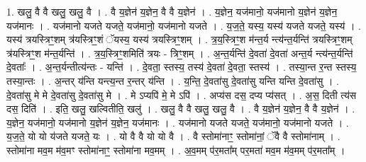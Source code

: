 \documentclass[17pt]{extarticle}
\begin{document}
1. खलु॒ वै वै खलु॒ खलु॒ वै । . वै य॒ज्ञेन॑ य॒ज्ञेन॒ वै वै य॒ज्ञेन॑ । . य॒ज्ञेन॒ यज॑मानो॒ यज॑मानो य॒ज्ञेन॑ य॒ज्ञेन॒ यज॑मानः । . यज॑मानो यजते यजते॒ यज॑मानो॒ यज॑मानो यजते । . य॒ज॒ते॒ यस्य॒ यस्य॑ यजते यजते॒ यस्य॑ । . यस्य॑ त्रयस्त्रिꣳ॒॒शम् त्र॑यस्त्रिꣳ॒॒शं ॅयस्य॒ यस्य॑ त्रयस्त्रिꣳ॒॒शम् । . त्र॒य॒स्त्रिꣳ॒॒श म॑न्त॒र्य न्त्य॑न्त॒र्यन्ति॑ त्रयस्त्रिꣳ॒॒शम् त्र॑यस्त्रिꣳ॒॒श म॑न्त॒र्यन्ति॑ । . त्र॒य॒स्त्रिꣳ॒॒शमिति॑ त्रयः - त्रिꣳ॒॒शम् । . अ॒न्त॒र्यन्ति॑ दे॒वता॑ दे॒वता॑ अन्त॒र्य न्त्य॑न्त॒र्यन्ति॑ दे॒वताः᳚ । . अ॒न्त॒र्यन्तीत्य॑न्तः - यन्ति॑ । . दे॒वता॒ स्तस्य॒ तस्य॑ दे॒वता॑ दे॒वता॒ स्तस्य॑ । . तस्या॒न्त र॒न्त स्तस्य॒ तस्या॒न्तः । . अ॒न्तर् य॑न्ति यन्त्य॒न्त र॒न्तर् य॑न्ति । . य॒न्ति॒ दे॒वता॑सु दे॒वता॑सु यन्ति यन्ति दे॒वता॑सु । . दे॒वता॑सु मे मे दे॒वता॑सु दे॒वता॑सु मे । . मे ऽप्यपि॑ मे॒ मे ऽपि॑ । . अप्य॑स दस॒ दप्य प्य॑सत् । . अ॒स॒ दिती त्य॑स दस॒ दिति॑ । . इति॒ खलु॒ खल्वितीति॒ खलु॑ । . खलु॒ वै वै खलु॒ खलु॒ वै । . वै य॒ज्ञेन॑ य॒ज्ञेन॒ वै वै य॒ज्ञेन॑ । . य॒ज्ञेन॒ यज॑मानो॒ यज॑मानो य॒ज्ञेन॑ य॒ज्ञेन॒ यज॑मानः । . यज॑मानो यजते यजते॒ यज॑मानो॒ यज॑मानो यजते । . य॒ज॒ते॒ यो यो य॑जते यजते॒ यः । . यो वै वै यो यो वै । . वै स्तोमा॑नाꣳ॒॒ स्तोमा॑नां॒ ॅवै वै स्तोमा॑नाम् । . स्तोमा॑ना मव॒म म॑व॒मꣳ स्तोमा॑नाꣳ॒॒ स्तोमा॑ना मव॒मम् । . अ॒व॒मम् प॑र॒मता᳚म् पर॒मता॑ मव॒म म॑व॒मम् प॑र॒मता᳚म् । \newline
\end{document}
